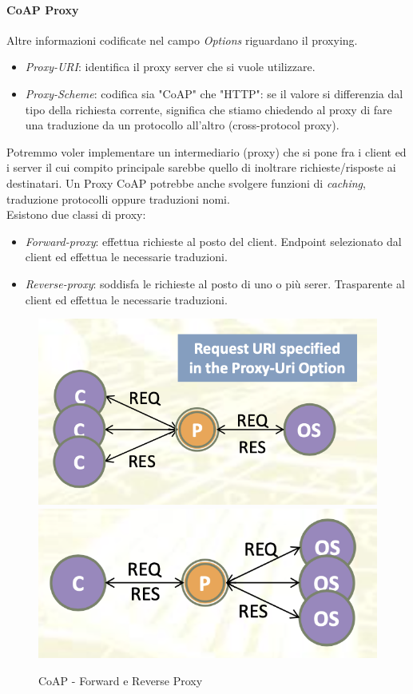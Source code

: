 \documentclass{article}
\begin{document}
\paragraph{CoAP Proxy} Altre informazioni codificate nel campo \textit{Options} riguardano il proxying.
\begin{itemize}
    \item \textit{Proxy-URI}: identifica il proxy server che si vuole utilizzare.
    \item \textit{Proxy-Scheme}: codifica sia "CoAP" che "HTTP": se il valore si differenzia dal tipo della richiesta corrente, significa che stiamo chiedendo al proxy di fare una traduzione da un protocollo all'altro (cross-protocol proxy).
\end{itemize}
Potremmo voler implementare un intermediario (proxy) che si pone fra i client ed i server il cui compito principale sarebbe quello di inoltrare richieste/risposte ai destinatari. Un Proxy CoAP potrebbe anche svolgere funzioni di \textit{caching}, traduzione protocolli oppure traduzioni nomi. \\ Esistono due classi di proxy:
\begin{itemize}
    \item \textit{Forward-proxy}: effettua richieste al posto del client. Endpoint selezionato dal client ed effettua le necessarie traduzioni.
    \item \textit{Reverse-proxy}: soddisfa le richieste al posto di uno o più serer. Trasparente al client ed effettua le necessarie traduzioni.
\end{itemize}
\begin{figure}[H]
\centering
\includegraphics[scale=0.4]{figures/forward proxy.png}
\includegraphics[scale=0.4]{figures/reverse proxy.png}
\caption{CoAP - Forward e Reverse Proxy}
\end{figure}
\end{document}
